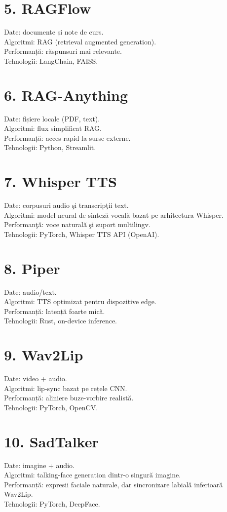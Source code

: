 \documentclass[12pt,a4paper]{report}
\begin{document}
\section{5. RAGFlow}
Date: documente și note de curs. \\
Algoritmi: RAG (retrieval augmented generation). \\
Performanță: răspunsuri mai relevante. \\
Tehnologii: LangChain, FAISS.

\section{6. RAG-Anything}
Date: fișiere locale (PDF, text). \\
Algoritmi: flux simplificat RAG. \\
Performanță: acces rapid la surse externe. \\
Tehnologii: Python, Streamlit.

\section{7. Whisper TTS}
Date: corpusuri audio şi transcripţii text. \\
Algoritmi: model neural de sinteză vocală bazat pe arhitectura Whisper. \\
Performanţă: voce naturală şi suport multilingv. \\
Tehnologii: PyTorch, Whisper TTS API (OpenAI).

\section{8. Piper}
Date: audio/text. \\
Algoritmi: TTS optimizat pentru dispozitive edge. \\
Performanță: latență foarte mică. \\
Tehnologii: Rust, on-device inference.

\section{9. Wav2Lip}
Date: video + audio. \\
Algoritmi: lip-sync bazat pe rețele CNN. \\
Performanță: aliniere buze-vorbire realistă. \\
Tehnologii: PyTorch, OpenCV.

\section{10. SadTalker}
Date: imagine + audio. \\
Algoritmi: talking-face generation dintr-o singură imagine. \\
Performanță: expresii faciale naturale, dar sincronizare labială inferioară Wav2Lip. \\
Tehnologii: PyTorch, DeepFace.
\end{document}
